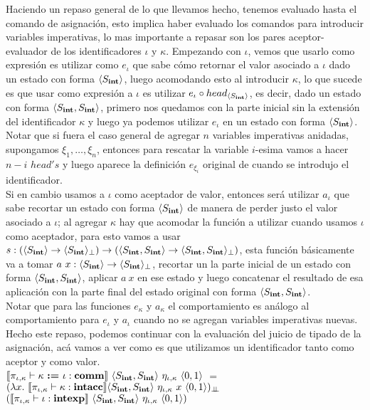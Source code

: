 Haciendo un repaso general de lo que llevamos hecho, tenemos evaluado hasta el comando
de asignaci\'on, esto implica haber evaluado los comandos para introducir variables 
imperativas, lo mas importante a repasar son los pares aceptor-evaluador de los
identificadores $\iota$ y $\kappa$. Empezando con $\iota$, vemos que usarlo como
expresi\'on es utilizar como $e_\iota$ que
sabe c\'omo retornar el valor asociado a $\iota$ dado un estado con forma $\langle S_{\textbf{int}} \rangle$,
luego acomodando esto al introducir $\kappa$, lo que sucede es que usar como expresi\'on
a $\iota$ es utilizar $e_\iota \circ head_{\langle S_{\textbf{int}} \rangle}$, es decir, dado
un estado con forma $\langle S_{\textbf{int}}, S_{\textbf{int}} \rangle$, primero nos quedamos con la
parte inicial sin la extensi\'on del identificador $\kappa$ y luego ya podemos
utilizar $e_\iota$ en un estado con forma $\langle S_{\textbf{int}} \rangle$. Notar que
si fuera el caso general de agregar $n$ variables imperativas anidadas, supongamos
$\xi_1,\ldots,\xi_n$, entonces para rescatar
la variable $i$-esima vamos a hacer $n-i$ $head's$ y luego aparece la definici\'on
$e_{\xi_i}$ original de cuando se introdujo el identificador.\\
Si en cambio usamos a $\iota$ como aceptador de valor, entonces ser\'a utilizar
$a_\iota$ que sabe recortar un estado con forma $\langle S_{\textbf{int}} \rangle$ de manera
de perder justo el valor asociado a $\iota$; al agregar
$\kappa$ hay que acomodar la funci\'on a utilizar cuando usamos $\iota$ como aceptador,
para esto vamos a usar 
$s : (\langle S_{\textbf{int}} \rangle \rightarrow \langle S_{\textbf{int}} \rangle_{\bot})
	 \rightarrow 
	 (\langle S_{\textbf{int}},S_{\textbf{int}} \rangle \rightarrow \langle S_{\textbf{int}},S_{\textbf{int}} \rangle_{\bot})$, esta
funci\'on b\'asicamente va a tomar $a \ x : \langle S_{\textbf{int}} \rangle \rightarrow \langle S_{\textbf{int}} \rangle_{\bot}$,
recortar un la parte inicial de un estado con forma $\langle S_{\textbf{int}},S_{\textbf{int}} \rangle$, aplicar
$a \ x$ en ese estado y luego concatenar el resultado de esa aplicaci\'on con la parte
final del estado original con forma $\langle S_{\textbf{int}},S_{\textbf{int}} \rangle$.\\
Notar que para las funciones $e_\kappa$ y $a_\kappa$ el comportamiento es an\'alogo
al comportamiento para $e_\iota$ y $a_\iota$ cuando no se agregan variables imperativas 
nuevas. Hecho este repaso, podemos continuar con la evaluaci\'on del juicio de tipado
de la asignaci\'on, ac\'a vamos a ver como es que utilizamos un identificador 
tanto como aceptor y como valor.\\

$\llbracket \pi_{\iota,\kappa} \vdash \kappa \ \textbf{:=} \ \iota: \textbf{comm} \rrbracket
		\ \langle S_{\textbf{int}},S_{\textbf{int}} \rangle \ \eta_{\iota,\kappa}
		\ \langle 0,1 \rangle$ $=$\\
\indent \indent \indent \indent
$(\lambda x . \ \llbracket \pi_{\iota,\kappa} \vdash \kappa : \textbf{intacc} \rrbracket
	\langle S_{\textbf{int}},S_{\textbf{int}} \rangle 
	\ \eta_{\iota,\kappa}
	\ x \ \langle 0,1 \rangle)_{\bot \!\!\! \bot}$\\
\indent \indent \indent \indent \indent \indent \indent \indent
$(\llbracket  \pi_{\iota,\kappa} \vdash \iota : \textbf{intexp}  \rrbracket 
	\ \langle S_{\textbf{int}},S_{\textbf{int}} \rangle
	\ \eta_{\iota,\kappa} 
	\ \langle 0,1 \rangle)$\\
	

